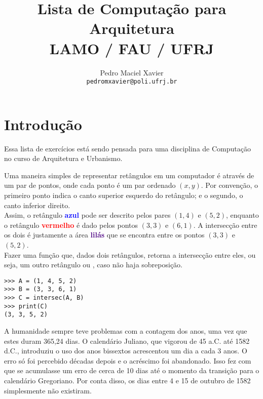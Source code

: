 \documentclass[12pt]{article}
\title{%
Lista de Computação para Arquitetura\\
{\normalsize LAMO / FAU / UFRJ}
}
\author{%
Pedro Maciel Xavier \\ 
\texttt{pedromxavier@poli.ufrj.br}
}
\begin{document}
	\maketitle
	\section*{Introdução}
	
	Essa lista de exercícios está sendo pensada para uma disciplina de Computação no curso de Arquitetura e Urbanismo.
	
	\cc
	
	
	
	Uma maneira simples de representar retângulos em um computador é através de um par de pontos, onde cada ponto é um par ordenado $(x, y)$. Por convenção, o primeiro ponto indica o canto superior esquerdo do retângulo; e o segundo, o canto inferior direito.\\
	
	
	Assim, o retângulo \textcolor{blue}{\textbf{azul}} pode ser descrito pelos pares $(1, 4)$ e $(5, 2)$, enquanto o retângulo \textcolor{red}{\textbf{vermelho}} é dado pelos pontos $(3, 3)$ e $(6, 1)$. A intersecção entre os dois é justamente a área \textcolor{indigo}{\textbf{lilás}} que se encontra entre os pontos $(3, 3)$ e $(5, 2)$. \\
	
	\quest Fazer uma função que, dados dois retângulos, retorna a intersecção entre eles, ou seja, um outro retângulo ou , caso não haja sobreposição.\\
	
	\example
	\begin{lstlisting}
>>> A = (1, 4, 5, 2)
>>> B = (3, 3, 6, 1)
>>> C = intersec(A, B)
>>> print(C)
(3, 3, 5, 2)
	\end{lstlisting}
	
	\pagebreak
	
	
	A humanidade sempre teve problemas com a contagem dos anos, uma vez que estes duram 365,24 dias. O calendário Juliano, que vigorou de 45 a.C. até 1582 d.C., introduziu o uso dos anos bissextos acrescentou um dia a cada 3 anos. O erro só foi percebido décadas depois e o acréscimo foi abandonado. Isso fez com que se acumulasse um erro de cerca de 10 dias até o momento da transição para o calendário Gregoriano. Por conta disso, os dias entre 4 e 15 de outubro de 1582 simplesmente não existiram.\\
	
\end{document}
